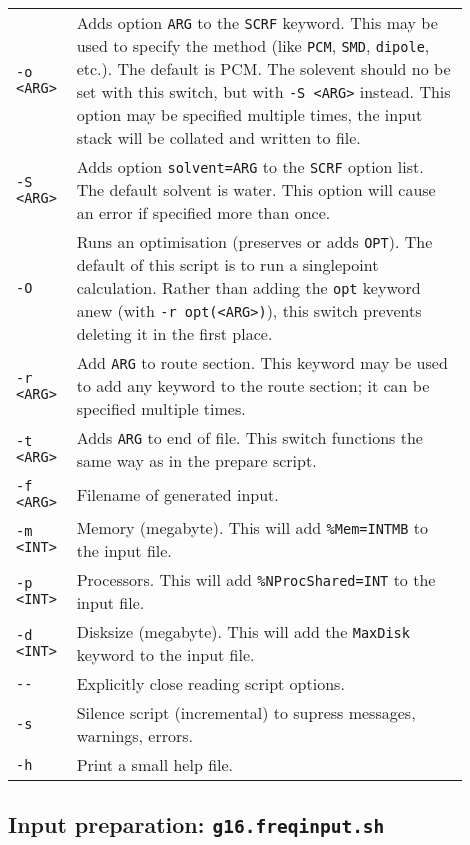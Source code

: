 \documentclass[   %
  final,          %
  a4paper         %
]{article}
\begin{document}
\begin{longtable}{p{0.1\linewidth}p{0.8\linewidth}}
  {\lstinline`-o <ARG>`} & Adds option {\lstinline`ARG`} to the \texttt{SCRF} keyword. 
    This may be used to specify the method (like \texttt{PCM}, \texttt{SMD}, \texttt{dipole}, etc.).
    The default is PCM. The solevent should no be set with this switch, 
    but with {\lstinline`-S <ARG>`} instead. 
    This option may be specified multiple times, the input stack will be collated and written to file. \\
  {\lstinline`-S <ARG>`} & Adds option \texttt{solvent={\lstinline`ARG`}} to the \texttt{SCRF} option list. 
    The default solvent is water. This option will cause an error if specified more than once.\\
  {\lstinline`-O`}       & Runs an optimisation (preserves or adds \texttt{OPT}).
    The default of this script is to run a singlepoint calculation. 
    Rather than adding the \texttt{opt} keyword anew (with {\lstinline`-r opt(<ARG>)`}), 
    this switch prevents deleting it in the first place. \\
  {\lstinline`-r <ARG>`} & Add {\lstinline`ARG`} to route section. 
    This keyword may be used to add any keyword to the route section; 
    it can be specified multiple times.\\
  {\lstinline`-t <ARG>`} & Adds {\lstinline`ARG`} to end of file. 
    This switch functions the same way as in the prepare script. \\
  {\lstinline`-f <ARG>`} & Filename of generated input. \\
  {\lstinline`-m <INT>`} & Memory (megabyte). This will add \texttt{\%Mem={\lstinline`INT`}MB} to the input file. \\
  {\lstinline`-p <INT>`} & Processors. This will add \texttt{\%NProcShared={\lstinline`INT`}} to the input file. \\
  {\lstinline`-d <INT>`} & Disksize (megabyte). This will add the \texttt{MaxDisk} keyword to the input file. \\
  {\lstinline`--`}       & Explicitly close reading script options. \\
  {\lstinline`-s`}       & Silence script (incremental) to supress messages, warnings, errors. \\
  {\lstinline`-h`}       & Print a small help file. \\
\end{longtable}

\subsection{Input preparation: \texorpdfstring{{\lstinline`g16.freqinput.sh`}}{g16.freqinput.sh}}
\end{document}
